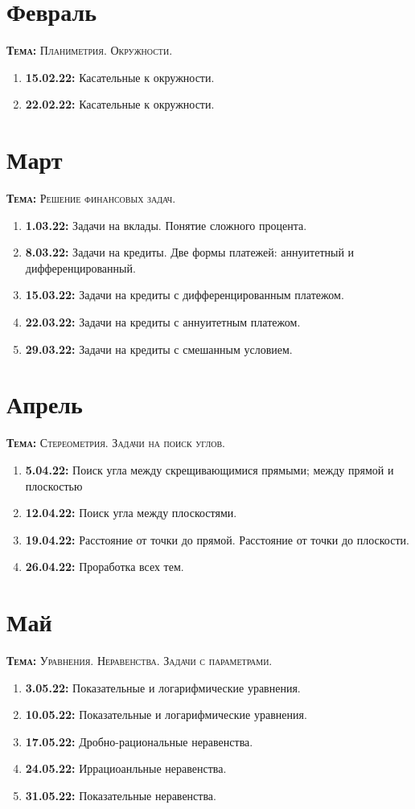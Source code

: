 \documentclass[12pt, a4paper]{article}
\begin{document}
	
 
\section*{Февраль}
	\textsc{\textbf{Тема:} Планиметрия. Окружности.}
	\begin{enumerate}[label=\textbf{\arabic*})]
		\item \textbf{15.02.22:} Касательные к окружности.
		\item \textbf{22.02.22:} Касательные к окружности.
	\end{enumerate}
\section*{Март}
	\textsc{\textbf{Тема:} Решение финансовых задач.}
	\begin{enumerate}[label=\textbf{\arabic*})]
		\item \textbf{1.03.22:} Задачи на вклады. Понятие сложного процента.
		\item \textbf{8.03.22:} Задачи на кредиты. Две формы платежей: аннуитетный и дифференцированный.
		\item \textbf{15.03.22:} Задачи на кредиты с дифференцированным платежом.
		\item \textbf{22.03.22:} Задачи на кредиты с аннуитетным платежом.
		\item \textbf{29.03.22:} Задачи на кредиты с смешанным условием.
	\end{enumerate}
\section*{Апрель}
	\textsc{\textbf{Тема:} Стереометрия. Задачи на поиск углов.}
	\begin{enumerate}[label=\textbf{\arabic*})]
		\item \textbf{5.04.22:} Поиск угла между скрещивающимися прямыми; между прямой и плоскостью
		\item \textbf{12.04.22:} Поиск угла между плоскостями.
		\item \textbf{19.04.22:} Расстояние от точки до прямой. Расстояние от точки до плоскости.
		\item \textbf{26.04.22:} Проработка всех тем.
	\end{enumerate}
\section*{Май}
	\textsc{\textbf{Тема:} Уравнения. Неравенства. Задачи с параметрами.}
	\begin{enumerate}[label=\textbf{\arabic*})]
		\item \textbf{3.05.22:} Показательные и логарифмические уравнения.
		\item \textbf{10.05.22:} Показательные и логарифмические уравнения.
		\item \textbf{17.05.22:} Дробно-рациональные неравенства.
		\item \textbf{24.05.22:} Иррациоанльные неравенства.
		\item \textbf{31.05.22:} Показательные неравенства.
	\end{enumerate}
\end{document}
